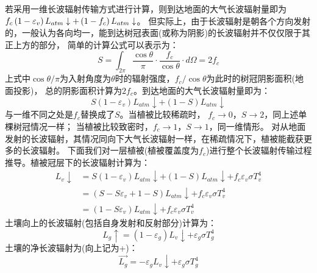 若采用一维长波辐射传输方式进行计算，则到达地面的大气长波辐射量即为$f_c\left(1-\varepsilon_v\right)\\L_{atm}\downarrow+\left(1-f_c\right)L_{atm}\downarrow$。
但实际上，由于长波辐射是朝各个方向发射的，一般认为各向均一，能到达树冠表面(或称为阴影)的长波辐射并不仅仅限于其正上方的部分，
简单的计算公式可以表示为：
\begin{equation}
S=\int_{2 \pi} \frac{\cos \theta}{\pi} \cdot \frac{f_{c}}{\cos \theta} \cdot d \Omega=2 f_{c}
\end{equation}
上式中$\cos{\theta}/\pi$为入射角度为$\theta$时的辐射强度，$f_c/\cos{\theta}$为此时的树冠阴影面积(地面投影)，
总的阴影面积计算为$2f_c$。到达地面的大气长波辐射量即为：
\begin{equation}
S\left(1-\varepsilon_{v}\right) L_{atm} \downarrow+(1-S) L_{atm} \downarrow
\end{equation}
与一维不同之处是$f_c$替换成了$S$。当植被比较稀疏时，
$f_c\rightarrow0$，$S\rightarrow2$，同上述单棵树冠情况一样；
当植被比较致密时，$f_c\rightarrow1$，$S\rightarrow1$，同一维情形。
对从地面发射的长波辐射，其情况同向下大气长波辐射一样，在稀疏情况下，植被能截获更多的长波辐射。
下面我们对一层植被(植被覆盖度为$f_c$)进行整个长波辐射传输过程推导。植被冠层下的长波辐射计算为：
\begin{equation}
\begin{aligned} L_{v} \downarrow &=S\left(1-\varepsilon_{v}\right) L_{atm} \downarrow+(1-S) L_{atm} \downarrow+f_{c} 
    \varepsilon_{v} \sigma T_{v}^{4} \\ &=\left(S-S \varepsilon_{v}+1-S\right) L_{atm} \downarrow+f_{c} \varepsilon_{v} 
    \sigma T_{v}^{4} \\ &=\left(1-S \varepsilon_{v}\right) L_{atm} \downarrow+f_{c} \varepsilon_{v} \sigma T_{v}^{4} \end{aligned}
\end{equation}
土壤向上的长波辐射(包括自身发射和反射部分)计算为：
\begin{equation}
L_{g} \uparrow=\left(1-\varepsilon_{g}\right) L_{v} \downarrow+\varepsilon_{g} \sigma T_{g}^{4}
\end{equation}
土壤的净长波辐射为(向上记为+)：
\begin{equation}
\overrightarrow{L_{g}}=-\varepsilon_{g} L_{v} \downarrow+\varepsilon_{g} \sigma T_{g}^{4}
\end{equation}
